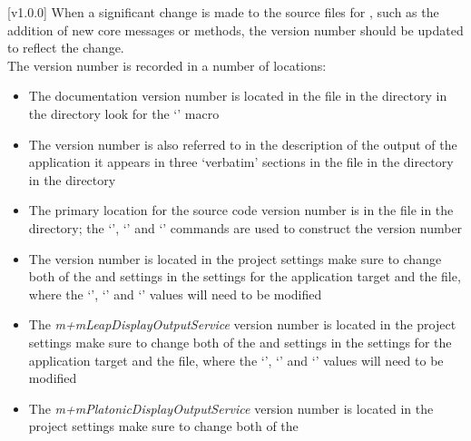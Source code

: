 [v1.0.0]
When a significant change is made to the source files for \mplusm, such as the addition of
new core messages or methods, the version number should be updated to reflect the
change.\\

The version number is recorded in a number of locations:
\begin{itemize}
\item The documentation version number is located in the  file
in the  directory in the  directory
\longDash{} look for the `' macro
\item\exSp{}The version number is also referred to in the description of the output of
the  application \longDash{} it appears in three `verbatim'
sections in the  file in the  directory in the
 directory
\item\exSp{}The primary location for the source code version number is in the
 file in the  directory; the
`', `'
and `' commands are used to construct the version
number
\item\exSp{}The \emph{\MMMU} version number is located in the  project
settings \longDash{} make sure to change both of the  and 
settings in the  settings for the application target \longDash{} and the
 file, where the `', `'
and `' values will need to be modified
\item\exSp{}The \emph{m+mLeapDisplayOutputService} version number is located in the
 project settings \longDash{} make sure to change both of the
 and  settings in the  settings for the
application target \longDash{} and the  file, where the
`', `' and `' values will
need to be modified
\item\exSp{}The \emph{m+mPlatonicDisplayOutputService} version number is located in the
 project settings \longDash{} make sure to change both of the

\end{itemize}
